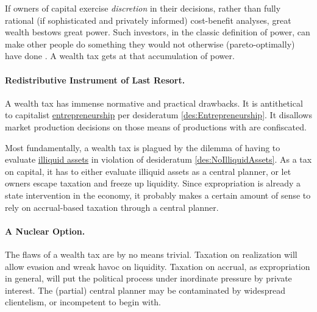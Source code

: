 If owners of capital exercise \emph{discretion} in their decisions, rather than fully rational (if sophisticated and privately informed) cost-benefit analyses, great wealth bestows great power.
Such investors, in the classic definition of power, can make other people do something they would not otherwise (pareto-optimally) have done \citep[8ff]{Geoff2002}.
A wealth tax gets at that accumulation of power.

\paragraph{Redistributive Instrument of Last Resort.}
A wealth tax has immense normative and practical drawbacks.
It is antithetical to capitalist \hyperref[des:Entrepreneurship]{entrepreneurship} per desideratum \ref{des:Entrepreneurship}.
It disallows market production decisions on those means of productions with are confiscated.

Most fundamentally, a wealth tax is plagued by the dilemma of having to evaluate \hyperref[des:NoIlliquidAssets]{illiquid assets} in violation of desideratum \ref{des:NoIlliquidAssets}.
As a tax on capital, it has to either evaluate illiquid assets as a central planner, or let owners escape taxation and freeze up liquidity.
Since expropriation is already a state intervention in the economy, it probably makes a certain amount of sense to rely on accrual-based taxation through a central planner.

\paragraph{A Nuclear Option.}
The flaws of a wealth tax are by no means trivial.
Taxation on realization will allow evasion and wreak havoc on liquidity.
Taxation on accrual, as expropriation in general, will put the political process under inordinate pressure by private interest.
The (partial) central planner may be contaminated by widespread clientelism, or incompetent to begin with.

